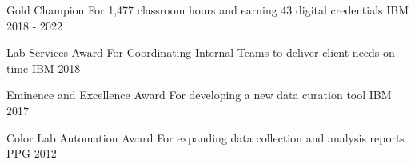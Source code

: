 

\begin{cvhonors}

  \cvhonor
    {Gold Champion} %
    {For 1,477 classroom hours and earning 43 digital credentials} %
    {IBM} %
    {2018 - 2022} %

  \cvhonor
    {Lab Services Award} %
    {For Coordinating Internal Teams to deliver client needs on time} %
    {IBM} %
    {2018} %

%
  \cvhonor
    {Eminence and Excellence Award} %
    {For developing a new data curation tool} %
    {IBM} %
    {2017} %

  \cvhonor
    {Color Lab Automation Award} %
    {For expanding data collection and analysis reports}
    {PPG} %
    {2012} %

\end{cvhonors}
